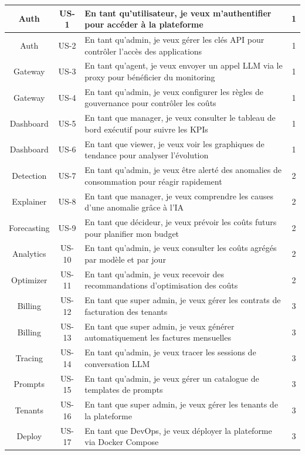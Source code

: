 \begin{longtable}{|c|c|p{7.5cm}|c|}
Auth & US-1 & En tant qu'utilisateur, je veux m'authentifier pour accéder à la plateforme & 1 \\
\hline
Auth & US-2 & En tant qu'admin, je veux gérer les clés API pour contrôler l'accès des applications & 1 \\
\hline
Gateway & US-3 & En tant qu'agent, je veux envoyer un appel LLM via le proxy pour bénéficier du monitoring & 1 \\
\hline
Gateway & US-4 & En tant qu'admin, je veux configurer les règles de gouvernance pour contrôler les coûts & 1 \\
\hline
Dashboard & US-5 & En tant que manager, je veux consulter le tableau de bord exécutif pour suivre les KPIs & 1 \\
\hline
Dashboard & US-6 & En tant que viewer, je veux voir les graphiques de tendance pour analyser l'évolution & 1 \\
\hline
Detection & US-7 & En tant qu'admin, je veux être alerté des anomalies de consommation pour réagir rapidement & 2 \\
\hline
Explainer & US-8 & En tant que manager, je veux comprendre les causes d'une anomalie grâce à l'IA & 2 \\
\hline
Forecasting & US-9 & En tant que décideur, je veux prévoir les coûts futurs pour planifier mon budget & 2 \\
\hline
Analytics & US-10 & En tant qu'admin, je veux consulter les coûts agrégés par modèle et par jour & 2 \\
\hline
Optimizer & US-11 & En tant qu'admin, je veux recevoir des recommandations d'optimisation des coûts & 2 \\
\hline
Billing & US-12 & En tant que super admin, je veux gérer les contrats de facturation des tenants & 3 \\
\hline
Billing & US-13 & En tant que super admin, je veux générer automatiquement les factures mensuelles & 3 \\
\hline
Tracing & US-14 & En tant qu'admin, je veux tracer les sessions de conversation LLM & 3 \\
\hline
Prompts & US-15 & En tant qu'admin, je veux gérer un catalogue de templates de prompts & 3 \\
\hline
Tenants & US-16 & En tant que super admin, je veux gérer les tenants de la plateforme & 3 \\
\hline
Deploy & US-17 & En tant que DevOps, je veux déployer la plateforme via Docker Compose & 3 \\
\hline
\end{longtable}



